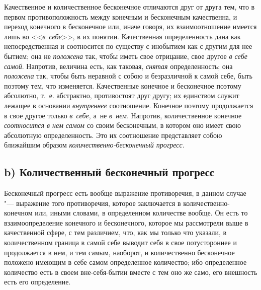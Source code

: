 Качественное и количественное бесконечное отличаются друг от друга тем, что
в первом противоположность между конечным и бесконечным качественна, и переход
конечного в бесконечное или, иначе говоря, их взаимоотношение имеется лишь во
<<{\em в~себе}>>, в их понятии. Качественная определенность дана как
непосредственная и соотносится по существу с инобытием как с другим для нее
бытием; она не {\em положена} так, чтобы иметь свое отрицание, свое другое
{\em в себе самой}. Напротив, величина есть, как таковая, {\em снятая}
определенность; она {\em положена} так, чтобы быть неравной с собою и
безразличной к самой себе, быть поэтому тем, что изменяется. Качественные
конечное и бесконечное поэтому абсолютно, т.~е. абстрактно, противостоят друг
другу; их единством служит лежащее в основании {\em внутреннее} соотношение.
Конечное поэтому продолжается в свое другое только {\em в~себе}, а~не
{\em в~нем}. Напротив, количественное конечное {\em соотносится в нем самом}
со своим бесконечным, в котором оно имеет свою абсолютную определенность. Это
их соотношение представляет собою ближайшим образом
{\em количественно-бесконечный прогресс}.

\subsection[b) Количественный бесконечный прогресс]%
{b) Количественный бесконечный прогресс}

Бесконечный прогресс есть вообще выражение противоречия, в данном случае "---
выражение того противоречия, которое заключается в количественно-конечном или,
иными словами, в определенном количестве вообще. Он есть то взаимоопределение
конечного и бесконечного, которое мы рассмотрели выше в качественной сфере,
с тем различием, что, как мы только что указали, в количественном граница
в самой себе выводит себя в свое потустороннее и продолжается в нем, и тем
самым, наоборот, и количественно бесконечное положено имеющим в себе самом
определенное количество; ибо определенное количество есть в своем
вне-себя-бытии вместе с тем оно же само, его внешность есть его определение.

